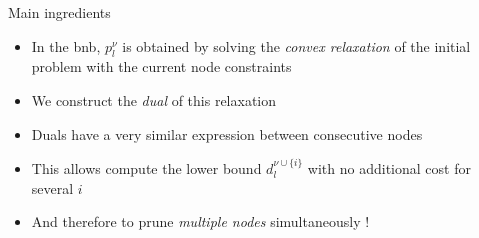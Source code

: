 \documentclass[final]{beamer}
\newlength{\sepwid}
\newlength{\onecolwid}
\newlength{\twocolwid}
\newcommand{\emphone}[1]{\textit{\color{norange}#1}}
\begin{document}
\begin{frame}[t]
\begin{columns}[t]
\begin{column}{\twocolwid}
\begin{columns}[t,totalwidth=\twocolwid]
\begin{column}{\onecolwid}
\begin{alertblock}{Main ingredients}
                \begin{itemize}
                    \item \hspace*{0.1em} In the \gls{bnb}, $p_l^{\nu}$ is obtained by solving the \emphone{convex relaxation} of the initial problem with the current node constraints
                    \item \hspace*{0.1em} We construct the \emphone{dual} of this relaxation
                    \item \hspace*{0.1em} Duals have a very similar expression between consecutive nodes
                    \item \hspace*{0.1em} This allows compute the lower bound $d_l^{\nu \cup \{i\}}$ with no additional cost for several $i$
                    \item \hspace*{0.1em} And therefore to prune \emphone{multiple nodes} simultaneously !
                \end{itemize}
            \end{alertblock}
        \end{column}
    \end{columns}

    \begin{figure}
        \begin{subfigure}[b]{0.49\textwidth}
            \centering
            
        \end{subfigure}
        \hfill
        \begin{subfigure}[b]{0.49\textwidth}
            \centering
            
        \end{subfigure}
    \end{figure}
\end{column}

\begin{column}{\sepwid}\end{column}


\end{columns}
\end{frame}
\end{document}
